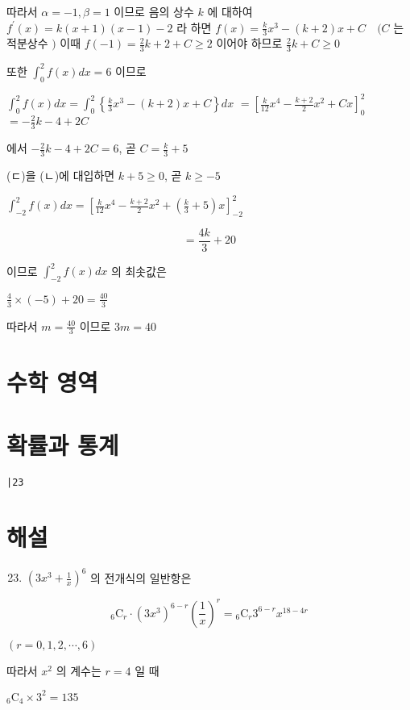 \documentclass[10pt]{article}
\begin{document}
따라서 \(\alpha=-1, \beta=1\) 이므로 음의 상수 \(k\) 에 대하여 \(f^{\prime}(x)=k(x+1)(x-1)-2\) 라 하면 \(f(x)=\frac{k}{3} x^{3}-(k+2) x+C \quad(C\) 는 적분상수 \()\) 이때 \(f(-1)=\frac{2}{3} k+2+C \geq 2\) 이어야 하므로 \(\frac{2}{3} k+C \geq 0\)

또한 \(\int_{0}^{2} f(x) d x=6\) 이므로

\(\int_{0}^{2} f(x) d x=\int_{0}^{2}\left\{\frac{k}{3} x^{3}-(k+2) x+C\right\} d x\) \(=\left[\frac{k}{12} x^{4}-\frac{k+2}{2} x^{2}+C x\right]_{0}^{2}\) \(=-\frac{2}{3} k-4+2 C\)

에서 \(-\frac{2}{3} k-4+2 C=6\), 곧 \(C=\frac{k}{3}+5\)

(ㄷ)을 (ㄴ)에 대입하면 \(k+5 \geq 0\), 곧 \(k \geq-5\)

\(\int_{-2}^{2} f(x) d x=\left[\frac{k}{12} x^{4}-\frac{k+2}{2} x^{2}+\left(\frac{k}{3}+5\right) x\right]_{-2}^{2}\)

\[
=\frac{4 k}{3}+20
\]

이므로 \(\int_{-2}^{2} f(x) d x\) 의 최솟값은

\(\frac{4}{3} \times(-5)+20=\frac{40}{3}\)

따라서 \(m=\frac{40}{3}\) 이므로 \(3 m=40\)

\section*{수학 영역}
\section*{확률과 통계}
\begin{verbatim}
|23
\end{verbatim}

\section*{해설}
\begin{enumerate}
  \setcounter{enumi}{22}
  \item \(\left(3 x^{3}+\frac{1}{x}\right)^{6}\) 의 전개식의 일반항은
\end{enumerate}

\[
{ }_{6} \mathrm{C}_{r} \cdot\left(3 x^{3}\right)^{6-r}\left(\frac{1}{x}\right)^{r}={ }_{6} \mathrm{C}_{r} 3^{6-r} x^{18-4 r}
\]

\((r=0,1,2, \cdots, 6)\)

따라서 \(x^{2}\) 의 계수는 \(r=4\) 일 때

\({ }_{6} \mathrm{C}_{4} \times 3^{2}=135\)
\end{document}
